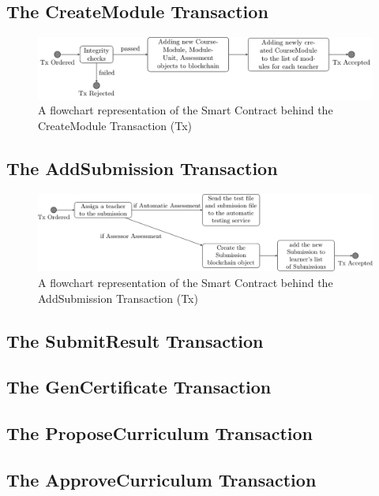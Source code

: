 \subsection{The CreateModule Transaction}
\begin{figure}[!ht]
    \centering
    \includegraphics[width=1.0\textwidth]{cmtx}
    \caption{A flowchart representation of the Smart Contract behind the CreateModule Transaction (Tx)} \label{fig:cmtx}
\end{figure}

\subsection{The AddSubmission Transaction}

\begin{figure}[!ht]
    \centering
    \includegraphics[width=1.0\textwidth]{astx}
    \caption{A flowchart representation of the Smart Contract behind the AddSubmission Transaction (Tx)} \label{fig:astx}
\end{figure}

\subsection{The SubmitResult Transaction}

\subsection{The GenCertificate Transaction}

\subsection{The ProposeCurriculum Transaction}

\subsection{The ApproveCurriculum Transaction}


